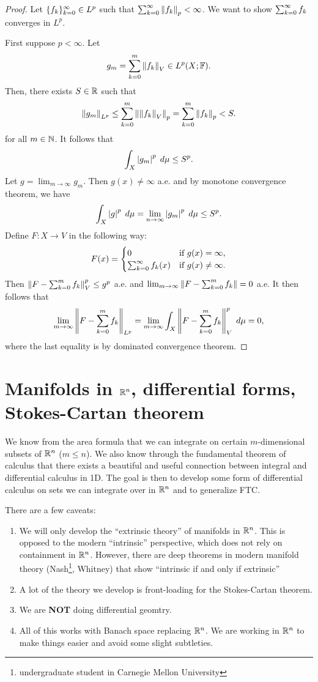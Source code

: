 \documentclass[a4paper]{article}
\begin{document}
\begin{proof}
Let $\{ f_k \}_{k=0}^\infty \in L^p$ such that $\sum_{k=0}^\infty \left\lVert f_k\right\rVert_p 
< \infty$. We want to show $\sum_{k=0}^\infty f_k$ converges in $L^p$.

First suppose $p < \infty$. Let 
\[
g_m = \sum_{k=0}^m \left\lVert f_k\right\rVert_V \in L^p(X; \mathbb{F}).
\]
Then, there exists $S \in \mathbb{R}$ such that 
\[
\left\lVert g_m\right\rVert_{L^p} \leq \sum_{k=0}^m \left\lVert \left\lVert f_k\right\rVert_V\right\rVert_p 
= \sum_{k=0}^m \left\lVert f_k\right\rVert_p < S.
\]
for all $m \in \mathbb{N}$. It follows that 
\[
\int_X \left\lvert g_m\right\rvert^p \; d \mu \leq S^p.
\]
Let $g = \lim_{m \to \infty} g_m$. Then  
$g(x) \neq \infty$ a.e. and by monotone convergence theorem, 
we have 
\[
\int_X \left\lvert g\right\rvert^p \; d \mu = \lim_{n \to \infty} 
\left\lvert g_m\right\rvert^p \; d \mu \leq S^p.
\]
Define $F: X \to V$ in the following way: 
\[
F(x) = \begin{cases}
  0 & \text{if $g(x) = \infty$}, \\
  \sum_{k=0}^\infty f_k(x) & \text{if $g(x) \neq \infty$}.
\end{cases}
\]
Then $\left\lVert F - \sum_{k=0}^m f_k\right\rVert_V^p \leq g^p$ a.e.
and $\lim_{m \to \infty} \left\lVert F - \sum_{k=0}^m f_k\right\rVert = 0$ a.e.
It then follows that 
\[
\lim_{m \to \infty} \left\lVert F - \sum_{k=0}^m f_k\right\rVert_{L^p}
= \lim_{m \to \infty} \int_X \left\lVert F - \sum_{k=0}^m f_k\right\rVert^p_V \; d \mu
= 0,
\]
where the last equality is by dominated convergence
theorem.
\end{proof}





\section{Manifolds in $\mathbb{R}^n$, differential forms, 
Stokes-Cartan theorem}

We know from the area formula that we can integrate on 
certain $m$-dimensional subsets of $\mathbb{R}^n$ ($m \leq n$).
We also know through the fundamental theorem of calculus that 
there exists a beautiful and useful connection between 
integral and differential calculus in 1D. The goal is then 
to develop some form of differential calculus on sets we can 
integrate over in $\mathbb{R}^n$ and to generalize FTC.

There are a few caveats:
\begin{enumerate}
\item We will only develop the ``extrinsic theory'' of 
manifolds in $\mathbb{R}^n$. This is opposed to the modern ``intrinsic''
perspective, which does not rely on containment in $\mathbb{R}^n$.
However, there are deep theorems in modern manifold theory 
(Nash\footnote{undergraduate student in Carnegie Mellon 
University}, Whitney) that show ``intrinsic if and only if 
extrinsic''

\item A lot of the theory we develop is front-loading 
for the Stokes-Cartan theorem.

\item We are \textbf{NOT} doing differential geomtry.

\item All of this works with Banach space replacing $\mathbb{R}^n$.
We are working in $\mathbb{R}^n$ to make things easier and avoid 
some slight subtleties.
\end{enumerate}
\end{document}
